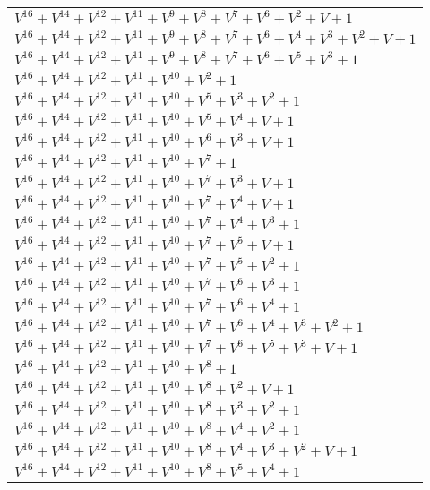 \documentclass[12pt]{article}
\begin{document}
\begin{adjustwidth}{-4cm}{}
\begin{center}
\begin{longtable}{|l|}
$V^{16}  +V^{14}  +V^{12}  +V^{11}  +V^{9}  +V^{8}  +V^{7}  +V^{6}  +V^{2}  + V + 1$ \\
$V^{16}  +V^{14}  +V^{12}  +V^{11}  +V^{9}  +V^{8}  +V^{7}  +V^{6}  +V^{4}  +V^{3}  +V^{2}  + V + 1$ \\
$V^{16}  +V^{14}  +V^{12}  +V^{11}  +V^{9}  +V^{8}  +V^{7}  +V^{6}  +V^{5}  +V^{3}  + 1$ \\
$V^{16}  +V^{14}  +V^{12}  +V^{11}  +V^{10}  +V^{2}  + 1$ \\
$V^{16}  +V^{14}  +V^{12}  +V^{11}  +V^{10}  +V^{5}  +V^{3}  +V^{2}  + 1$ \\
$V^{16}  +V^{14}  +V^{12}  +V^{11}  +V^{10}  +V^{5}  +V^{4}  + V + 1$ \\
$V^{16}  +V^{14}  +V^{12}  +V^{11}  +V^{10}  +V^{6}  +V^{3}  + V + 1$ \\
$V^{16}  +V^{14}  +V^{12}  +V^{11}  +V^{10}  +V^{7}  + 1$ \\
$V^{16}  +V^{14}  +V^{12}  +V^{11}  +V^{10}  +V^{7}  +V^{3}  + V + 1$ \\
$V^{16}  +V^{14}  +V^{12}  +V^{11}  +V^{10}  +V^{7}  +V^{4}  + V + 1$ \\
$V^{16}  +V^{14}  +V^{12}  +V^{11}  +V^{10}  +V^{7}  +V^{4}  +V^{3}  + 1$ \\
$V^{16}  +V^{14}  +V^{12}  +V^{11}  +V^{10}  +V^{7}  +V^{5}  + V + 1$ \\
$V^{16}  +V^{14}  +V^{12}  +V^{11}  +V^{10}  +V^{7}  +V^{5}  +V^{2}  + 1$ \\
$V^{16}  +V^{14}  +V^{12}  +V^{11}  +V^{10}  +V^{7}  +V^{6}  +V^{3}  + 1$ \\
$V^{16}  +V^{14}  +V^{12}  +V^{11}  +V^{10}  +V^{7}  +V^{6}  +V^{4}  + 1$ \\
$V^{16}  +V^{14}  +V^{12}  +V^{11}  +V^{10}  +V^{7}  +V^{6}  +V^{4}  +V^{3}  +V^{2}  + 1$ \\
$V^{16}  +V^{14}  +V^{12}  +V^{11}  +V^{10}  +V^{7}  +V^{6}  +V^{5}  +V^{3}  + V + 1$ \\
$V^{16}  +V^{14}  +V^{12}  +V^{11}  +V^{10}  +V^{8}  + 1$ \\
$V^{16}  +V^{14}  +V^{12}  +V^{11}  +V^{10}  +V^{8}  +V^{2}  + V + 1$ \\
$V^{16}  +V^{14}  +V^{12}  +V^{11}  +V^{10}  +V^{8}  +V^{3}  +V^{2}  + 1$ \\
$V^{16}  +V^{14}  +V^{12}  +V^{11}  +V^{10}  +V^{8}  +V^{4}  +V^{2}  + 1$ \\
$V^{16}  +V^{14}  +V^{12}  +V^{11}  +V^{10}  +V^{8}  +V^{4}  +V^{3}  +V^{2}  + V + 1$ \\
$V^{16}  +V^{14}  +V^{12}  +V^{11}  +V^{10}  +V^{8}  +V^{5}  +V^{4}  + 1$ \\

\end{longtable}
\end{center}
\end{adjustwidth}
\end{document}
